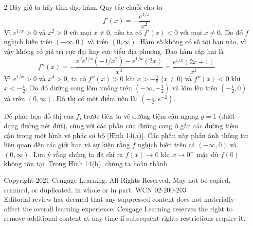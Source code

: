 \begin{paracol}{2}
Bây giờ ta hãy tính đạo hàm. Quy tắc chuỗi cho ta
\[
f'(x) = -\frac{e^{1/x}}{x^2}
\]
Vì $e^{1/x} > 0$ và $x^2 > 0$ với mọi $x \neq 0$, nên ta có $f'(x) < 0$ với mọi $x \neq 0$. Do đó $f$ nghịch biến trên $(-\infty, 0)$ và trên $(0, \infty)$. Hàm số không có số tới hạn nào, vì vậy không có giá trị cực đại hay cực tiểu địa phương. Đạo hàm cấp hai là
\[
f''(x) = -\frac{x^2 e^{1/x}(-1/x^2) - e^{1/x}(2x)}{x^4} = \frac{e^{1/x}(2x + 1)}{x^4}
\]
Vì $e^{1/x} > 0$ và $x^4 > 0$, ta có $f''(x) > 0$ khi $x > -\frac{1}{2}$ ($x \neq 0$) và $f''(x) < 0$ khi $x < -\frac{1}{2}$. Do đó đường cong lõm xuống trên $(-\infty, -\frac{1}{2})$ và lõm lên trên $(-\frac{1}{2}, 0)$ và trên $(0, \infty)$. Đồ thị có một điểm uốn là: $(-\frac{1}{2}, e^{-2})$.\par
\vspace{4pt}

Để phác họa đồ thị của $f$, trước tiên ta vẽ đường tiệm cận ngang $y = 1$ (dưới dạng đường nét đứt), cùng với các phần của đường cong ở gần các đường tiệm cận trong một hình vẽ phác sơ bộ [Hình 14(a)]. Các phần này phản ánh thông tin liên quan đến các giới hạn và sự kiện rằng $f$ nghịch biến trên cả $(-\infty, 0)$ và $(0, \infty)$. Lưu ý rằng chúng ta đã chỉ ra $f(x) \to 0$ khi $x \to 0^-$ mặc dù $f(0)$ không tồn tại. Trong Hình 14(b), chúng ta hoàn thành

\end{paracol}

\vfill
\begin{center}
{\fontsize{5.5pt}{6.5pt}\selectfont\color{gray}
Copyright 2021 Cengage Learning. All Rights Reserved. May not be copied, scanned, or duplicated, in whole or in part. WCN 02-200-203\\ 
Editorial review has deemed that any suppressed content does not materially affect the overall learning experience. Cengage Learning reserves the right to remove additional content at any time if subsequent rights restrictions require it.
}
\end{center}
